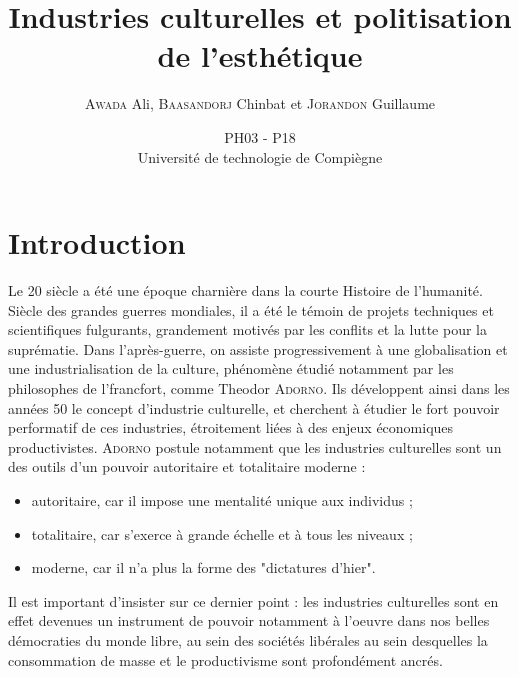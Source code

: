 \documentclass[a4paper,14pt]{extreport}
\title{Industries culturelles et politisation de l'esthétique}
\author{\textsc{Awada} Ali, \textsc{Baasandorj} Chinbat et \textsc{Jorandon} Guillaume}
\date{PH03 - P18\\ Université de technologie de Compiègne\\\vspace{1cm}}
\begin{document}
\maketitle

\tableofcontents

\chapter*{Introduction}

Le 20 siècle a été une époque charnière dans la courte Histoire de l'humanité. Siècle des grandes guerres mondiales, il a été le témoin de projets techniques et scientifiques fulgurants, grandement motivés par les conflits et la lutte pour la suprématie. Dans l'après-guerre, on assiste progressivement à une globalisation et une industrialisation de la culture, phénomène étudié notamment par les philosophes de l'\gls{francfort}, comme Theodor \textsc{Adorno}. Ils développent ainsi dans les années 50 le concept d'industrie culturelle, et cherchent à étudier le fort pouvoir performatif de ces industries, étroitement liées à des enjeux économiques productivistes. \textsc{Adorno} postule notamment que les industries culturelles sont un des outils d'un pouvoir autoritaire et totalitaire moderne :

\begin{itemize}
    \item{autoritaire, car il impose une mentalité unique aux individus ;}
    \item{totalitaire, car s'exerce à grande échelle et à tous les niveaux ;}
    \item{moderne, car il n'a plus la forme des "dictatures d'hier".}
\end{itemize}

Il est important d'insister sur ce dernier point : les industries culturelles sont en effet devenues un instrument de pouvoir notamment à l'oeuvre dans nos belles démocraties du monde libre, au sein des sociétés libérales au sein desquelles la consommation de masse et le productivisme sont profondément ancrés.
\end{document}
